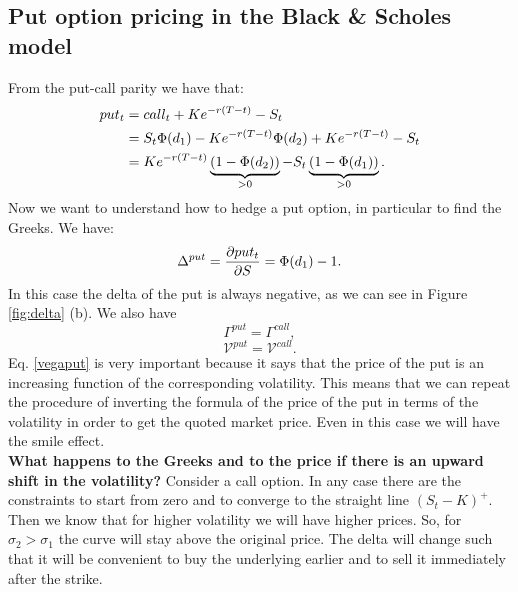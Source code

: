 \subsection{Put option pricing in the Black \& Scholes model}
From the put-call parity we have that:
\begin{align}
    \notag put_t &= call_t + Ke^{-r(T-t)} - S_t \\
    &=
    \notag S_t\Phi(d_1) - Ke^{-r(T-t)}\Phi(d_2) + Ke^{-r(T-t)} - S_t \\
    &=
    Ke^{-r(T-t)}\underbrace{(1-\Phi(d_2))}_{>0} - S_t\underbrace{(1-\Phi(d_1))}_{>0}.
\end{align}
Now we want to understand how to hedge a put option, in particular to find the Greeks. We have:
\begin{equation}
    \Delta^{put} = \pdv{put_t}{S} = \Phi(d_1)-1.
\end{equation}
In this case the delta of the put is always negative, as we can see in Figure \ref{fig:delta} (b). We also have
\begin{equation}
    \Gamma^{put} = \Gamma^{call},
\end{equation}
\begin{equation}\label{vegaput}
    \mathcal{V}^{put} = \mathcal{V}^{call}.
\end{equation}
Eq. \eqref{vegaput} is very important because it says that the price of the put is an increasing function of the corresponding volatility. This means that we can repeat the procedure of inverting the formula of the price of the put in terms of the volatility in order to get the quoted market price. Even in this case we will have the smile effect.\\
\textbf{What happens to the Greeks and to the price if there is an upward shift in the volatility?} Consider a call option. In any case there are the constraints to start from zero and to converge to the straight line $(S_t-K)^+$. Then we know that for higher volatility we will have higher prices. So, for $\sigma_2>\sigma_1$ the curve will stay above the original price.
The delta will change such that it will be convenient to buy the underlying earlier and to sell it immediately after the strike.
